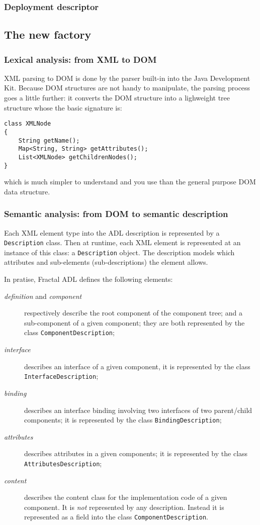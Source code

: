 \documentclass{article}
\newcommand{\code}[1]{\texttt{#1}}
\newcommand{\xml}[1]{\textsl{#1}}
\begin{document}
\subsubsection{Deployment descriptor}


\subsection{The new factory}


\subsubsection{Lexical analysis: from XML to DOM}

XML parsing to DOM is done by the parser built-in into the Java Development Kit.
Because DOM structures are not handy to manipulate, the parsing process goes a little
further: it converts the DOM structure into a lighweight tree structure whose the
basic signature is:

\begin{lstlisting}
class XMLNode
{
	String getName();
	Map<String, String> getAttributes();
	List<XMLNode> getChildrenNodes();
}
\end{lstlisting}
which is much simpler to understand and you use than the general purpose DOM data structure.

\subsubsection{Semantic analysis: from DOM to semantic description}

Each XML element type into the ADL description is represented by a  \code{Description} class.
Then at runtime, each XML element is represented at an instance of this class: a  \code{Description} object.
The description models which attributes and sub-elements (sub-descriptions) the element allows.

In pratise, Fractal ADL  defines the following elements:
\begin{description}
\item[\xml{definition} and \xml{component}] respectively describe  the root component of the component tree;
and a sub-component of a given component; they are both represented by the class \code{ComponentDescription};
\item[\xml{interface}] describes an interface of a given component, it is represented by the class \code{InterfaceDescription};
\item[\xml{binding}] describes an interface binding involving two interfaces of two parent/child components;
it is represented by the class \code{BindingDescription};
\item[\xml{attributes}] describes attributes in a given components; it is represented by the class \code{AttributesDescription};
\item[\xml{content}] describes the content class for the implementation code of a given component. It is
{\em not} represented by any description. Instead it is represented as a field into the class \code{ComponentDescription}.
\end{description}
\end{document}

